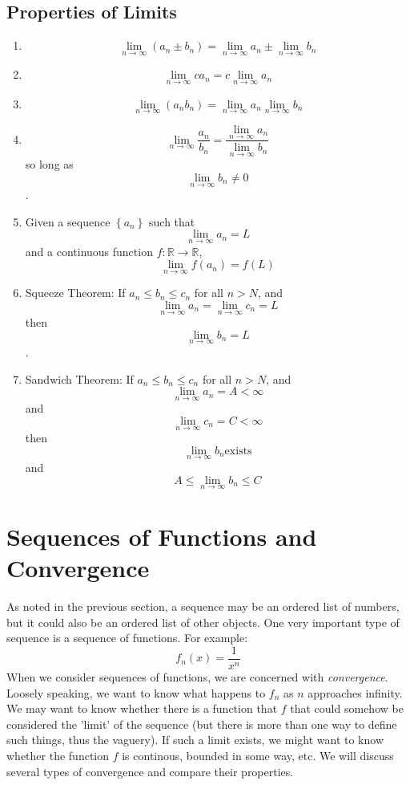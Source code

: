 \documentclass[12pt,a4paper]{article} %
\begin{document}
\subsection{Properties of Limits}
\begin{enumerate}
\item $$\lim_{n\rightarrow\infty}\left(a_n\pm b_n\right) = \lim_{n\rightarrow\infty} a_n \pm \lim_{n\rightarrow\infty} b_n$$
\item $$\lim_{n\rightarrow\infty}c a_n = c \lim_{n\rightarrow\infty} a_n$$
\item $$\lim_{n\rightarrow\infty}\left(a_n b_n\right) = \lim_{n\rightarrow\infty} a_n \lim_{n\rightarrow\infty} b_n$$
\item $$\lim_{n\rightarrow\infty}\frac{a_n}{b_n} = \frac{\lim_{n\rightarrow\infty} a_n}{ \lim_{n\rightarrow\infty} b_n}$$ so long as $$\lim_{n\rightarrow\infty}b_n\neq 0$$.
\item Given a sequence $\left\{a_n\right\}$ such that $$\lim_{n\rightarrow\infty} a_n = L$$ and a continuous function $f:\mathbb{R}\rightarrow\mathbb{R}$, $$\lim_{n\rightarrow\infty} f(a_n) = f(L)$$
\item Squeeze Theorem:  If $a_n\leq b_n\leq c_n$ for all $n>N$, and $$\lim_{n\rightarrow\infty}a_n = \lim_{n\rightarrow\infty} c_n = L$$ then $$\lim_{n\rightarrow\infty}b_n = L$$.
\item Sandwich Theorem:  If $a_n\leq b_n\leq c_n$ for all $n>N$, and $$\lim_{n\rightarrow\infty}a_n = A<\infty$$  and $$ \lim_{n\rightarrow\infty} c_n = C<\infty$$ then $$\lim_{n\rightarrow\infty}b_n  \mathrm{exists}$$ and  $$A\leq\lim_{n\rightarrow\infty}b_n\leq C$$
\end{enumerate}
\section{Sequences of Functions and Convergence}
As noted in the previous section, a sequence may be an ordered list of numbers, but it could also be an ordered list of other objects.  One very important type of sequence is a sequence of functions.  For example:
$$f_n(x) = \frac{1}{x^n}$$
When we consider sequences of functions, we are concerned with \emph{convergence}.  Loosely speaking, we want to know what happens to $f_n$ as $n$ approaches infinity.  We may want to know whether there is a function that $f$ that could somehow be considered the 'limit' of the sequence (but there is more than one way to define such things, thus the vaguery).  If such a limit exists, we might want to know whether the function $f$ is continous, bounded in some way, etc. We will discuss several types of convergence and compare their properties.
\end{document}
